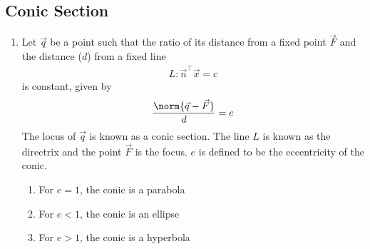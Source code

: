 \documentclass{article}
\numberwithin{equation}{section}
\numberwithin{figure}{section}
\begin{document}
\subsection{Conic Section}
\begin{enumerate}[label=\thesubsection.\arabic*.,ref=\thesubsection.\theenumi]
\item
  Let $\vec{q}$ be a point such that the ratio of its distance from a fixed point $\vec{F}$ and the distance ($d$) from a fixed line 
	\begin{align}
L: \vec{n}^{\top}\vec{x}=c 
\end{align}
is constant, given by 
\label{conics/30/def}
\begin{align}
\frac{\norm{\vec{q}-\vec{F}}}{d} = e    
\end{align}
The locus of $\vec{q}$ is known as a conic section. The line $L$ is known as the directrix and the point $\vec{F}$ is the focus. $e$ is defined to be 
the eccentricity of the conic.  
\begin{enumerate}
    \item For $e = 1$, the conic is a parabola
    \item For $e < 1$, the conic is an ellipse
    \item For $e > 1$, the conic is a hyperbola
\end{enumerate}


\end{enumerate}
\end{document}
